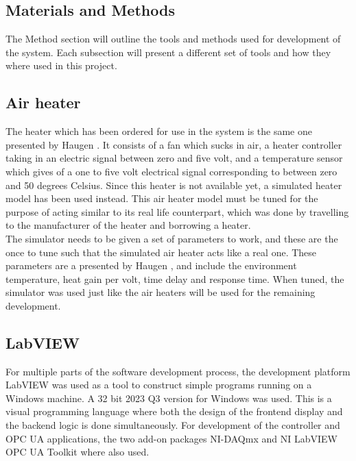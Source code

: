 \documentclass[11pt, A4paper, english]{article}
\numberwithin{equation}{section}
\begin{document}
\begin{multicols}{2}
		\section{Materials and Methods}
The Method section will outline the tools and methods used for development of the system. Each subsection will present a different set of tools and how they where used in this project.
		
		\subsection{Air heater}
The heater which has been ordered for use in the system is the same one presented by Haugen \cite{airheater}. It consists of a fan which sucks in air, a heater controller taking in an electric signal between zero and five volt, and a temperature sensor which gives of a one to five volt electrical signal corresponding to between zero and 50 degrees Celsius. Since this heater is not available yet, a simulated heater model \cite{airheatermodel} has been used instead. This air heater model must be tuned for the purpose of acting similar to its real life counterpart, which was done by travelling to the manufacturer of the heater and borrowing a heater. \\
The simulator needs to be given a set of parameters to work, and these are the once to tune such that the simulated air heater acts like a real one. These parameters are a presented by Haugen \cite{airheater}, and include the environment temperature, heat gain per volt, time delay and response time. When tuned, the simulator was used just like the air heaters will be used for the remaining development.

		\subsection{LabVIEW}
For multiple parts of the software development process, the development platform LabVIEW \cite{LabVIEW} was used as a tool to construct simple programs running on a Windows machine. A 32 bit 2023 Q3 version for Windows was used. This is a visual programming language where both the design of the frontend display and the backend logic is done simultaneously. For development of the controller and OPC UA applications, the two add-on packages NI-DAQmx and NI LabVIEW OPC UA Toolkit where also used.
		

\end{multicols}
\end{document}
